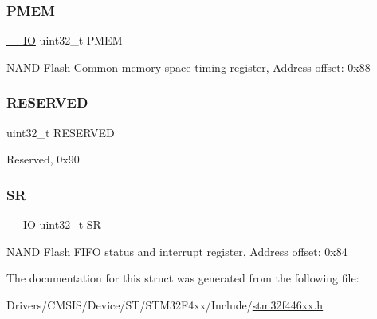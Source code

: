 \subsubsection{\texorpdfstring{P\+M\+EM}{PMEM}}
{\footnotesize\ttfamily \mbox{\hyperlink{core__sc300_8h_aec43007d9998a0a0e01faede4133d6be}{\+\_\+\+\_\+\+IO}} uint32\+\_\+t P\+M\+EM}

N\+A\+ND Flash Common memory space timing register, Address offset\+: 0x88 \mbox{\label{struct_f_m_c___bank3___type_def_a0e5030971ec1bfd3101f83f546493c83}} 
\subsubsection{\texorpdfstring{R\+E\+S\+E\+R\+V\+ED}{RESERVED}}
{\footnotesize\ttfamily uint32\+\_\+t R\+E\+S\+E\+R\+V\+ED}

Reserved, 0x90 \mbox{\label{struct_f_m_c___bank3___type_def_af6aca2bbd40c0fb6df7c3aebe224a360}} 
\subsubsection{\texorpdfstring{SR}{SR}}
{\footnotesize\ttfamily \mbox{\hyperlink{core__sc300_8h_aec43007d9998a0a0e01faede4133d6be}{\+\_\+\+\_\+\+IO}} uint32\+\_\+t SR}

N\+A\+ND Flash F\+I\+FO status and interrupt register, Address offset\+: 0x84 

The documentation for this struct was generated from the following file\+:\begin{DoxyCompactItemize}
\item 
Drivers/\+C\+M\+S\+I\+S/\+Device/\+S\+T/\+S\+T\+M32\+F4xx/\+Include/\mbox{\hyperlink{stm32f446xx_8h}{stm32f446xx.\+h}}\end{DoxyCompactItemize}
